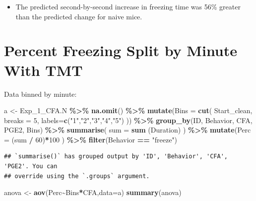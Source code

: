 \documentclass[
]{book}
\newenvironment{Shaded}{\begin{snugshade}}{\end{snugshade}}
\newcommand{\AttributeTok}[1]{\textcolor[rgb]{0.13,0.29,0.53}{#1}}
\newcommand{\DecValTok}[1]{\textcolor[rgb]{0.00,0.00,0.81}{#1}}
\newcommand{\FunctionTok}[1]{\textcolor[rgb]{0.13,0.29,0.53}{\textbf{#1}}}
\newcommand{\NormalTok}[1]{#1}
\newcommand{\OtherTok}[1]{\textcolor[rgb]{0.56,0.35,0.01}{#1}}
\newcommand{\SpecialCharTok}[1]{\textcolor[rgb]{0.81,0.36,0.00}{\textbf{#1}}}
\newcommand{\StringTok}[1]{\textcolor[rgb]{0.31,0.60,0.02}{#1}}
\providecommand{\tightlist}{%
  \setlength{\itemsep}{0pt}\setlength{\parskip}{0pt}}
\begin{document}
\begin{itemize}
\tightlist
\item
  The predicted second-by-second increase in freezing time was 56\% greater than the predicted change for naive mice.
\end{itemize}

\section*{Percent Freezing Split by Minute With TMT}\label{percent-freezing-split-by-minute-with-tmt}

Data binned by minute:

\begin{Shaded}
\begin{Highlighting}[]
\NormalTok{a }\OtherTok{\textless{}{-}}\NormalTok{ Exp\_1\_CFA.N }\SpecialCharTok{\%\textgreater{}\%}
  \FunctionTok{na.omit}\NormalTok{() }\SpecialCharTok{\%\textgreater{}\%}
  \FunctionTok{mutate}\NormalTok{(}\AttributeTok{Bins =} \FunctionTok{cut}\NormalTok{(}
\NormalTok{    Start\_clean,}
    \AttributeTok{breaks =} \DecValTok{5}\NormalTok{,}
    \AttributeTok{labels=}\FunctionTok{c}\NormalTok{(}\StringTok{"1"}\NormalTok{,}\StringTok{"2"}\NormalTok{,}\StringTok{"3"}\NormalTok{,}\StringTok{"4"}\NormalTok{,}\StringTok{"5"}\NormalTok{)}
\NormalTok{  )) }\SpecialCharTok{\%\textgreater{}\%}
  \FunctionTok{group\_by}\NormalTok{(ID, Behavior, CFA, PGE2, Bins) }\SpecialCharTok{\%\textgreater{}\%}
  \FunctionTok{summarise}\NormalTok{(}
    \AttributeTok{sum =} \FunctionTok{sum}\NormalTok{ (Duration)}
\NormalTok{  ) }\SpecialCharTok{\%\textgreater{}\%}
  \FunctionTok{mutate}\NormalTok{(}\AttributeTok{Perc =}\NormalTok{ (sum }\SpecialCharTok{/} \DecValTok{60}\NormalTok{)}\SpecialCharTok{*}\DecValTok{100}\NormalTok{ ) }\SpecialCharTok{\%\textgreater{}\%}
  \FunctionTok{filter}\NormalTok{(Behavior }\SpecialCharTok{==} \StringTok{"freeze"}\NormalTok{)}
\end{Highlighting}
\end{Shaded}

\begin{verbatim}
## `summarise()` has grouped output by 'ID', 'Behavior', 'CFA', 'PGE2'. You can
## override using the `.groups` argument.
\end{verbatim}

\begin{Shaded}
\begin{Highlighting}[]
\NormalTok{anova }\OtherTok{\textless{}{-}} \FunctionTok{aov}\NormalTok{(Perc}\SpecialCharTok{\textasciitilde{}}\NormalTok{Bins}\SpecialCharTok{*}\NormalTok{CFA,}\AttributeTok{data=}\NormalTok{a)}
\FunctionTok{summary}\NormalTok{(anova)}
\end{Highlighting}
\end{Shaded}
\end{document}
